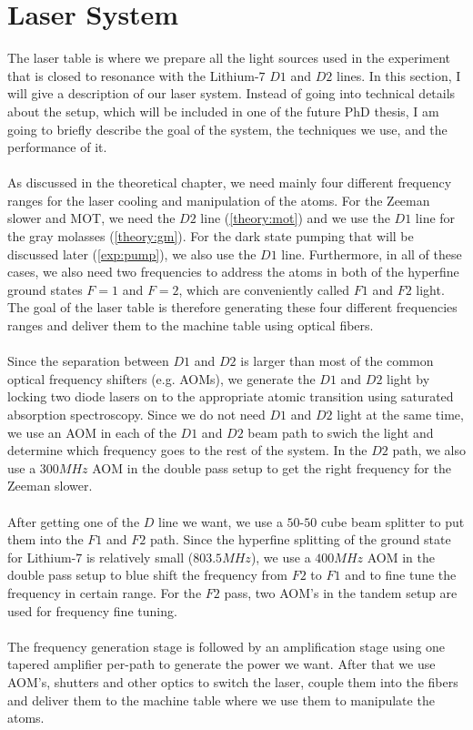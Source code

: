 \section{Laser System}\label{exp:laser-table}
The laser table is where we prepare all the light sources used in the experiment that is closed to resonance with the Lithium-$7$ $D1$ and $D2$ lines. In this section, I will give a description of our laser system. Instead of going into technical details about the setup, which will be included in one of the future PhD thesis, I am going to briefly describe the goal of the system, the techniques we use, and the performance of it.\\
\\
As discussed in the theoretical chapter, we need mainly four different frequency ranges for the laser cooling and manipulation of the atoms. For the Zeeman slower and MOT, we need the $D2$ line (\ref{theory:mot}) and we use the $D1$ line for the gray molasses (\ref{theory:gm}). For the dark state pumping that will be discussed later (\ref{exp:pump}), we also use the $D1$ line. Furthermore, in all of these cases, we also need two frequencies to address the atoms in both of the hyperfine ground states $F=1$ and $F=2$, which are conveniently called $F1$ and $F2$ light. The goal of the laser table is therefore generating these four different frequencies ranges and deliver them to the machine table using optical fibers.\\
\\
Since the separation between $D1$ and $D2$ is larger than most of the common optical frequency shifters (e.g. AOMs), we generate the $D1$ and $D2$ light by locking two diode lasers on to the appropriate atomic transition using saturated absorption spectroscopy. Since we do not need $D1$ and $D2$ light at the same time, we use an AOM in each of the $D1$ and $D2$ beam path to swich the light and determine which frequency goes to the rest of the system. In the $D2$ path, we also use a $300MHz$ AOM in the double pass setup to get the right frequency for the Zeeman slower.\\
\\
After getting one of the $D$ line we want, we use a $50$-$50$ cube beam splitter to put them into the $F1$ and $F2$ path. Since the hyperfine splitting of the ground state for Lithium-$7$ is relatively small ($803.5MHz$), we use a $400MHz$ AOM in the double pass setup to blue shift the frequency from $F2$ to $F1$ and to fine tune the frequency in certain range. For the $F2$ pass, two AOM's in the tandem setup are used for frequency fine tuning.\\
\\
The frequency generation stage is followed by an amplification stage using one tapered amplifier per-path to generate the power we want. After that we use AOM's, shutters and other optics to switch the laser, couple them into the fibers and deliver them to the machine table where we use them to manipulate the atoms.

